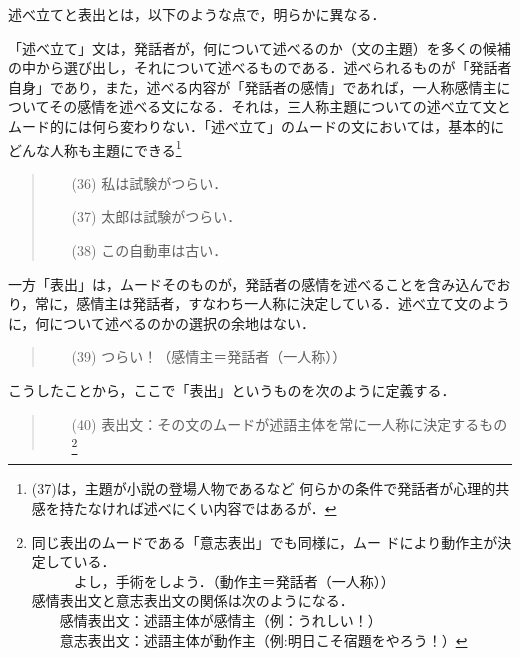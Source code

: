 述べ立てと表出とは，以下のような点で，明らかに異なる．

「述べ立て」文は，発話者が，何について述べるのか（文の主題）を多くの候補
の中から選び出し，それについて述べるものである．述べられるものが「発話者
自身」であり，また，述べる内容が「発話者の感情」であれば，一人称感情主に
ついてその感情を述べる文になる．それは，三人称主題についての述べ立て文と
ムード的には何ら変わりない．「述べ立て」のムードの文においては，基本的に
どんな人称も主題にできる\footnote{(37)は，主題が小説の登場人物であるなど
何らかの条件で発話者が心理的共感を持たなければ述べにくい内容ではあるが．}

\vspace{0.3cm}
\begin{quote}
\begin{itemize}
 \item[(36)] 私は試験がつらい．
 \item[(37)] 太郎は試験がつらい．
 \item[(38)] この自動車は古い．
\end{itemize}
\end{quote}
\vspace{0.3cm}

一方「表出」は，ムードそのものが，発話者の感情を述べることを含み込んでお
り，常に，感情主は発話者，すなわち一人称に決定している．述べ立て文のよう
に，何について述べるのかの選択の余地はない．

\vspace{0.3cm}
\begin{quote}
\begin{itemize}
 \item[(39)] つらい！（感情主＝発話者（一人称））
\end{itemize}
\end{quote}
\vspace{0.3cm}

こうしたことから，ここで「表出」というものを次のように定義する．

\vspace{0.3cm}
\begin{quote}
\begin{itemize}
 \item[(40)] 表出文：その文のムードが述語主体を常に一人称に決定するもの
	     \footnote{同じ表出のムードである「意志表出」でも同様に，ムー
	     ドにより動作主が決定している．\\
	     　　　よし，手術をしよう．（動作主＝発話者（一人称））\\
	     感情表出文と意志表出文の関係は次のようになる．\\
	     　　感情表出文：述語主体が感情主（例：うれしい！）\\
	     　　意志表出文：述語主体が動作主（例:明日こそ宿題をやろう！）}
\end{itemize}
\end{quote}
\vspace{0.3cm}

